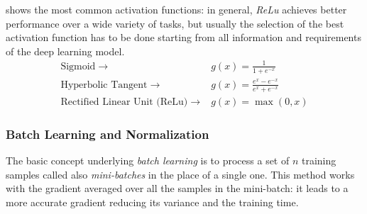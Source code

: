 shows the most common activation functions: in general, \textit{ReLu}  achieves better performance over a wide variety of tasks, but usually the selection of the best activation function has to be done starting from all information and requirements of the deep learning model.
\begin{equation}\label{eq:activation}
	\begin{aligned}
		\text{Sigmoid} \;\rightarrow\;                      & g(x) = \frac{1}{1+ e^{-x}}           \\
		\text{Hyperbolic Tangent} \;\rightarrow\;           & g(x) = \frac{e^x-e^{-x}}{e^x+e^{-x}} \\
		\text{Rectified Linear Unit (ReLu)} \;\rightarrow\; & g(x) = \max(0,x)
	\end{aligned}
\end{equation}

\subsubsection{Batch Learning and Normalization}
The basic concept underlying \textit{batch learning} \cite{stanford2019cs231n} is to process a set of $n$ training samples called also \textit{mini-batches} in the place of a single one. This method works with the gradient averaged over all the samples in the mini-batch: it leads to a more accurate gradient reducing its variance and the training time.

